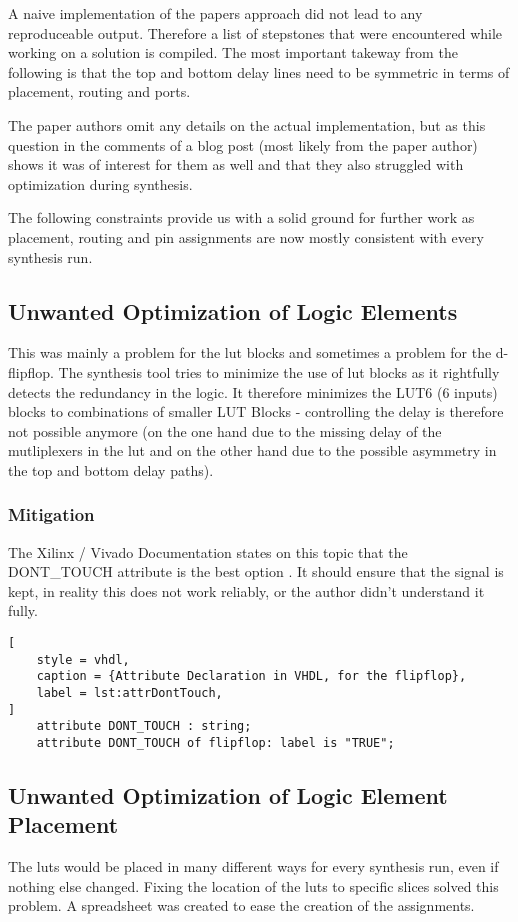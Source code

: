 A naive implementation of the papers approach did not lead to any reproduceable output.
Therefore a list of stepstones that were encountered while working on a solution is
compiled. The most important takeway from the following is that the top and bottom delay
lines need to be symmetric in terms of placement, routing and ports.

The paper authors omit any details on the actual implementation, but as this 
question in the comments of a blog post (most likely from the paper author) shows it was
of interest for them as well \autocite{Mehrdad2010} and that they also struggled with
optimization during synthesis.

The following constraints provide us with a solid ground for further work as placement,
routing and pin assignments are now mostly consistent with every synthesis run. 

\subsection{Unwanted Optimization of Logic Elements}
This was mainly a problem for the \gls{lut} blocks and sometimes a problem for
the d-flipflop. The synthesis tool tries to minimize the use of \gls{lut} blocks as it
rightfully detects the redundancy in the logic. It therefore minimizes the LUT6 (6 inputs)
blocks to combinations of smaller LUT Blocks - controlling the delay is therefore not
possible anymore (on the one hand due to the missing delay of the mutliplexers in the lut
and on the other hand due to the possible asymmetry in the top and bottom delay paths).

\subsubsection{Mitigation}
The Xilinx / Vivado Documentation states on this topic that the DONT_TOUCH attribute is
the best option \autocite{XilinxAttributes}. It should ensure that the signal is kept, in
reality this does not work reliably, or the author didn't understand it fully. 

\begin{lstlisting}[
	style = vhdl,
	caption = {Attribute Declaration in VHDL, for the flipflop},
	label = lst:attrDontTouch,
]
	attribute DONT_TOUCH : string;
	attribute DONT_TOUCH of flipflop: label is "TRUE";
\end{lstlisting}

\subsection{Unwanted Optimization of Logic Element Placement}
The luts would be placed in many different ways for every synthesis run, even if nothing
else changed. Fixing the location of the luts to specific slices solved this problem.
A spreadsheet was created to ease the creation of the assignments.

